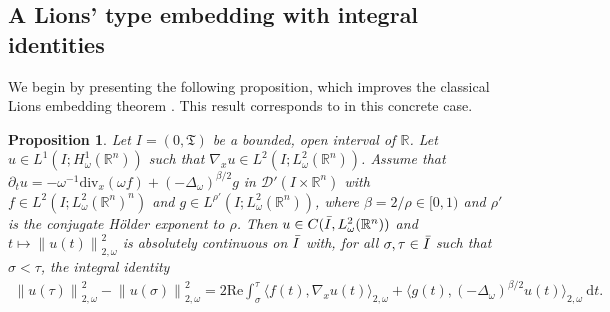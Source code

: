 \documentclass[12pt, letterpaper]{amsart}
\newtheorem{prop}[thm]{Proposition}
\theoremstyle{definition}
\theoremstyle{remark}
\numberwithin{equation}{section}
\begin{document}
\subsection{A Lions' type embedding with integral identities}
We begin by presenting the following proposition, which improves the classical Lions embedding theorem \cite{lions1957problemes}. This result corresponds to \cite[Theorem 2.1]{auscher2024fundamental} in this concrete case.
\begin{prop}\label{prop:energyboundedinterval} 
    Let $I=(0,\mathfrak{T})$ be a  bounded, open interval of $\mathbb{R}$. Let $u \in L^1(I;H^1_\omega(\mathbb{R}^n))$ such that $\nabla_x u\in L^2(I;L^2_\omega(\mathbb{R}^n))$. Assume that $\partial_t u =  - \omega^{-1} \mathrm{div}_x(\omega f)+(-\Delta_\omega)^{\beta/2} g$ in $\mathcal{D'}(I \times \mathbb{R}^n)$ with $f \in L^2(I;L^2_\omega(\mathbb{R}^n)^n)$ and 
     $g \in L^{\rho'}(I;L^2_\omega(\mathbb{R}^n))$, where ${\beta}={2}/{\rho} \in [0,1)$ and $\rho'$ is the conjugate H\"older exponent to $\rho$. Then $ u \in C(\Bar{I},L^2_\omega(\mathbb{R}^n))$
and $ t \mapsto \left \| u(t) \right \|^2_{2,\omega}$ is absolutely continuous on $\Bar{I}$ with, for all $ \sigma, \tau \in \Bar{I}$ such that $  \sigma < \tau$, the integral identity
\begin{align*}
        \left \| u(\tau) \right \|^2_{2,\omega}-\left \| u(\sigma) \right \|^2_{2,\omega} = 2\mathrm{Re}\int_{\sigma}^{\tau} \langle f(t),\nabla_x u(t)\rangle_{{2,\omega}} + \langle g(t),(-\Delta_\omega)^{\beta/2} u(t)\rangle_{{2,\omega}} \  \mathrm d t.
\end{align*}
\end{prop}
\end{document}
